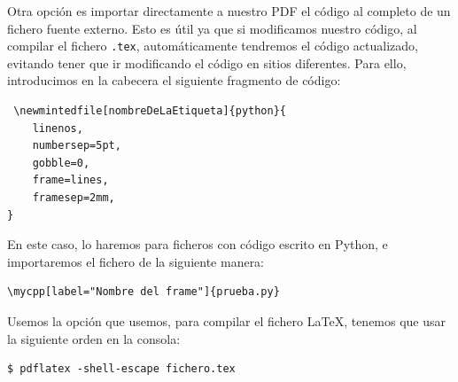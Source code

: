 \documentclass[a4paper]{article}
\begin{document}
Otra opción es importar directamente a nuestro PDF el código al completo de un fichero fuente externo. Esto es útil ya que si modificamos nuestro código, al compilar el fichero \texttt{.tex}, automáticamente tendremos el código actualizado, evitando tener que ir modificando el código en sitios diferentes. Para ello, introducimos en la cabecera el siguiente fragmento de código:

\begin{verbatim}
 \newmintedfile[nombreDeLaEtiqueta]{python}{
    linenos,
    numbersep=5pt,
    gobble=0,
    frame=lines,
    framesep=2mm,
}
\end{verbatim}

En este caso, lo haremos para ficheros con código escrito en Python, e importaremos el fichero de la siguiente manera:
\begin{verbatim}
\mycpp[label="Nombre del frame"]{prueba.py}
\end{verbatim}

Usemos la opción que usemos, para compilar el fichero \LaTeX, tenemos que usar la siguiente orden en la consola:

\begin{verbatim}
$ pdflatex -shell-escape fichero.tex
\end{verbatim}
\end{document}
